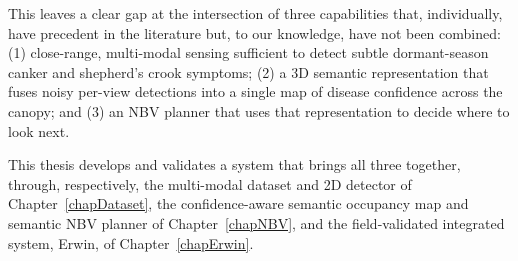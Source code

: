 
This leaves a clear gap at the intersection of three capabilities that,
individually, have precedent in the literature but, to our knowledge, have not
been combined: (1) close-range, multi-modal sensing sufficient to detect
subtle dormant-season canker and shepherd's crook symptoms; (2) a 3D semantic
representation that fuses noisy per-view detections into a single map of
disease confidence across the canopy; and (3) an NBV planner that uses that
representation to decide where to look next.

This thesis develops and validates a system that brings all three together,
through, respectively, the multi-modal dataset and 2D detector of
Chapter~\ref{chapDataset}, the confidence-aware semantic occupancy map and
semantic NBV planner of Chapter~\ref{chapNBV}, and the field-validated
integrated system, Erwin, of Chapter~\ref{chapErwin}.
